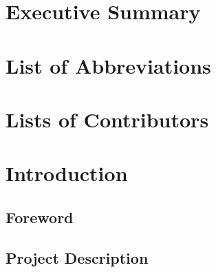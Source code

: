 \documentclass[
  11pt,
]{article}
\begin{document}
\clearpage

\renewcommand{\baselinestretch}{0.6}\normalsize
\setcounter{tocdepth}{3}
\tableofcontents
\renewcommand{\baselinestretch}{1.0}\normalsize

\clearpage

\hypertarget{executive-summary}{%
\section*{Executive Summary}\label{executive-summary}}

\clearpage

\listoffigures
\listoftables

\clearpage

\hypertarget{list-of-abbreviations}{%
\section*{List of Abbreviations}\label{list-of-abbreviations}}

\clearpage

\hypertarget{lists-of-contributors}{%
\section*{Lists of Contributors}\label{lists-of-contributors}}

\clearpage


\clearpage

\hypertarget{introduction}{%
\section{Introduction}\label{introduction}}

\hypertarget{foreword}{%
\subsection{Foreword}\label{foreword}}

\hypertarget{project-description}{%
\subsection{Project Description}\label{project-description}}
\end{document}
